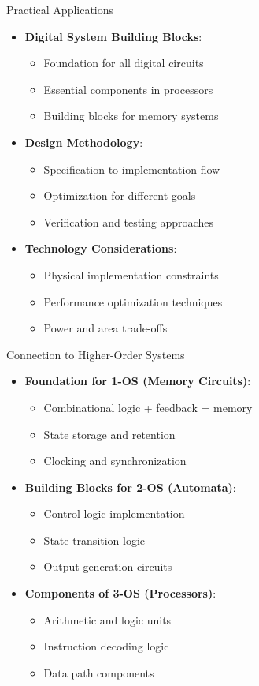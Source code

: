 \documentclass[aspectratio=169,11pt]{beamer}
\newcommand{\concept}[1]{\textbf{\color{accentcolor}#1}}
\begin{document}
\begin{frame}{Practical Applications}
\begin{itemize}
\item \concept{Digital System Building Blocks}:
\begin{itemize}
\item Foundation for all digital circuits
\item Essential components in processors
\item Building blocks for memory systems
\end{itemize}
\vspace{0.3cm}
\item \concept{Design Methodology}:
\begin{itemize}
\item Specification to implementation flow
\item Optimization for different goals
\item Verification and testing approaches
\end{itemize}
\vspace{0.3cm}
\item \concept{Technology Considerations}:
\begin{itemize}
\item Physical implementation constraints
\item Performance optimization techniques
\item Power and area trade-offs
\end{itemize}
\end{itemize}
\end{frame}

\begin{frame}{Connection to Higher-Order Systems}
\begin{itemize}
\item \concept{Foundation for 1-OS (Memory Circuits)}:
\begin{itemize}
\item Combinational logic + feedback = memory
\item State storage and retention
\item Clocking and synchronization
\end{itemize}
\vspace{0.3cm}
\item \concept{Building Blocks for 2-OS (Automata)}:
\begin{itemize}
\item Control logic implementation
\item State transition logic
\item Output generation circuits
\end{itemize}
\vspace{0.3cm}
\item \concept{Components of 3-OS (Processors)}:
\begin{itemize}
\item Arithmetic and logic units
\item Instruction decoding logic
\item Data path components
\end{itemize}
\end{itemize}
\end{frame}
\end{document}
